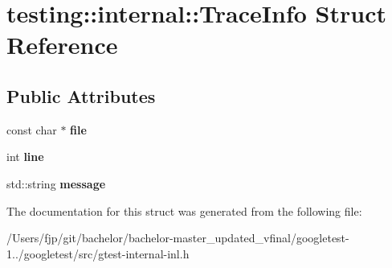 \hypertarget{structtesting_1_1internal_1_1_trace_info}{}\section{testing\+:\+:internal\+:\+:Trace\+Info Struct Reference}
\label{structtesting_1_1internal_1_1_trace_info}
\subsection*{Public Attributes}
\begin{DoxyCompactItemize}
\item 
\mbox{\label{structtesting_1_1internal_1_1_trace_info_a5d801209d3c0840aa55cfd4b67504254}} 
const char $\ast$ {\bfseries file}
\item 
\mbox{\label{structtesting_1_1internal_1_1_trace_info_ae9d269de1b77f4a3180d0d34acb4d7ff}} 
int {\bfseries line}
\item 
\mbox{\label{structtesting_1_1internal_1_1_trace_info_a39e74f39ce6d5fdbac799abdb1c27f90}} 
std\+::string {\bfseries message}
\end{DoxyCompactItemize}


The documentation for this struct was generated from the following file\+:\begin{DoxyCompactItemize}
\item 
/\+Users/fjp/git/bachelor/bachelor-\/master\+\_\+updated\+\_\+vfinal/googletest-\/1../googletest/src/gtest-\/internal-\/inl.\+h\end{DoxyCompactItemize}
